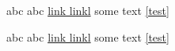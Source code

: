 \documentclass{article}
\begin{document}
 \leavevmode
   abc\label{test}
  \tagmcend
   abc
  \tagmcend
   \href{www.dante.de}{link linkl}
   some text
  \tagmcend
   \ref{test}
 \tagstructend %

   abc\label{test}
  \tagmcend
   abc
   \href{www.dante.de}{link linkl}
   some text
   \ref{test}
 \tagstructend %
\tagstructend %
\end{document}

